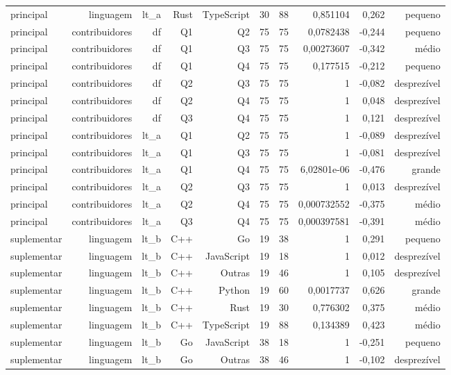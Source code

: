 \begin{tabular}{lrrrrrrrrr}
principal & linguagem & lt\_a & Rust & TypeScript & 30 & 88 & 0,851104 & 0,262 & pequeno \\
principal & contribuidores & df & Q1 & Q2 & 75 & 75 & 0,0782438 & -0,244 & pequeno \\
principal & contribuidores & df & Q1 & Q3 & 75 & 75 & 0,00273607 & -0,342 & médio \\
principal & contribuidores & df & Q1 & Q4 & 75 & 75 & 0,177515 & -0,212 & pequeno \\
principal & contribuidores & df & Q2 & Q3 & 75 & 75 & 1 & -0,082 & desprezível \\
principal & contribuidores & df & Q2 & Q4 & 75 & 75 & 1 & 0,048 & desprezível \\
principal & contribuidores & df & Q3 & Q4 & 75 & 75 & 1 & 0,121 & desprezível \\
principal & contribuidores & lt\_a & Q1 & Q2 & 75 & 75 & 1 & -0,089 & desprezível \\
principal & contribuidores & lt\_a & Q1 & Q3 & 75 & 75 & 1 & -0,081 & desprezível \\
principal & contribuidores & lt\_a & Q1 & Q4 & 75 & 75 & 6,02801e-06 & -0,476 & grande \\
principal & contribuidores & lt\_a & Q2 & Q3 & 75 & 75 & 1 & 0,013 & desprezível \\
principal & contribuidores & lt\_a & Q2 & Q4 & 75 & 75 & 0,000732552 & -0,375 & médio \\
principal & contribuidores & lt\_a & Q3 & Q4 & 75 & 75 & 0,000397581 & -0,391 & médio \\
suplementar & linguagem & lt\_b & C++ & Go & 19 & 38 & 1 & 0,291 & pequeno \\
suplementar & linguagem & lt\_b & C++ & JavaScript & 19 & 18 & 1 & 0,012 & desprezível \\
suplementar & linguagem & lt\_b & C++ & Outras & 19 & 46 & 1 & 0,105 & desprezível \\
suplementar & linguagem & lt\_b & C++ & Python & 19 & 60 & 0,0017737 & 0,626 & grande \\
suplementar & linguagem & lt\_b & C++ & Rust & 19 & 30 & 0,776302 & 0,375 & médio \\
suplementar & linguagem & lt\_b & C++ & TypeScript & 19 & 88 & 0,134389 & 0,423 & médio \\
suplementar & linguagem & lt\_b & Go & JavaScript & 38 & 18 & 1 & -0,251 & pequeno \\
suplementar & linguagem & lt\_b & Go & Outras & 38 & 46 & 1 & -0,102 & desprezível \\

\end{tabular}

